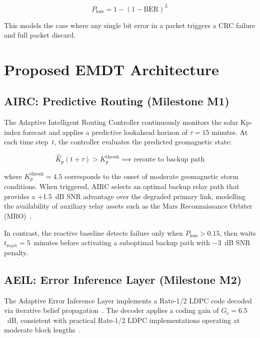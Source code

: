 \documentclass[journal]{IEEEtran}
\begin{document}
\begin{equation}
P_{\text{loss}} = 1 - (1 - \text{BER})^{L}
\label{eq:pktloss}
\end{equation}

This models the case where any single bit error in a packet triggers a CRC failure and full packet discard.



\section{Proposed EMDT Architecture}

\subsection{AIRC: Predictive Routing (Milestone M1)}
The Adaptive Intelligent Routing Controller continuously monitors the solar Kp-index forecast and applies a predictive lookahead horizon of $\tau = 15$ minutes.
At each time step~$t$, the controller evaluates the predicted geomagnetic state:

\begin{equation}
\hat{K}_p(t + \tau) > K_p^{\text{thresh}} \implies \text{reroute to backup path}
\label{eq:airc}
\end{equation}

\noindent where $K_p^{\text{thresh}} = 4.5$ corresponds to the onset of moderate geomagnetic storm conditions.
When triggered, AIRC selects an optimal backup relay path that provides a +1.5~dB SNR advantage over the degraded primary link, modelling the availability of auxiliary relay assets such as the Mars Reconnaissance Orbiter (MRO)~\cite{taylor2006dsn}.

In contrast, the reactive baseline detects failure only when $P_{\text{loss}} > 0.15$, then waits $t_{\text{react}} = 5$~minutes before activating a suboptimal backup path with $-3$~dB SNR penalty.

\subsection{AEIL: Error Inference Layer (Milestone M2)}
The Adaptive Error Inference Layer implements a Rate-1/2 LDPC code decoded via iterative belief propagation~\cite{gallager1962low, mackay1999good}.
The decoder applies a coding gain of $G_c = 6.5$~dB, consistent with practical Rate-1/2 LDPC implementations operating at moderate block lengths~\cite{richardson2008modern, ccsds2020ldpc}.
\end{document}
